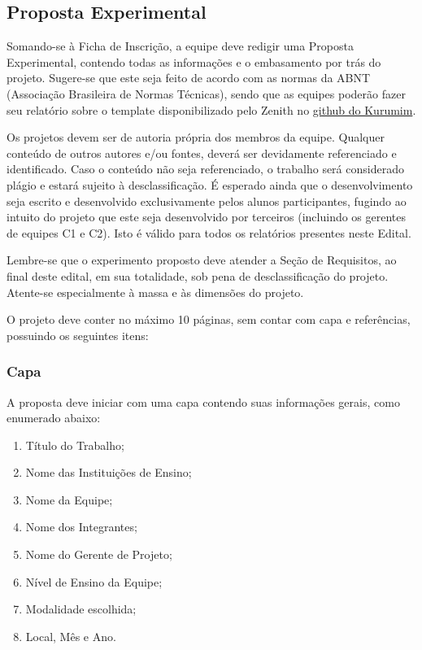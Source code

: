     \subsection{Proposta Experimental}
        Somando-se à Ficha de Inscrição, a equipe deve redigir uma Proposta Experimental, contendo todas as informações e o embasamento por trás do projeto. Sugere-se que este seja feito de acordo com as normas da ABNT (Associação Brasileira de Normas Técnicas), sendo que as equipes poderão fazer seu relatório sobre o template disponibilizado pelo Zenith no \href{https://github.com/zenitheesc/kurumim/tree/main/Relat%C3%B3rios}{\color{highcolor} github do Kurumim}.

        Os projetos devem ser de autoria própria dos membros da equipe. Qualquer conteúdo de outros autores e/ou fontes, deverá ser devidamente referenciado e identificado. Caso o conteúdo não seja referenciado, o trabalho será considerado plágio e estará sujeito à desclassificação. É esperado ainda que o desenvolvimento seja escrito e desenvolvido exclusivamente pelos alunos participantes, fugindo ao intuito do projeto que este seja desenvolvido por terceiros (incluindo os gerentes de equipes C1 e C2). Isto é válido para todos os relatórios presentes neste Edital.

        Lembre-se que o experimento proposto deve atender a Seção de Requisitos, ao final deste edital, em sua totalidade, sob pena de desclassificação do projeto. Atente-se especialmente à massa e às dimensões do projeto.

        O projeto deve conter no máximo 10 páginas, sem contar com capa e referências, possuindo os seguintes itens:
        
        \subsubsection{Capa}
            A proposta deve iniciar com uma capa contendo suas informações gerais, como enumerado abaixo:
            \begin{enumerate}
                \item Título do Trabalho; 
                \item Nome das Instituições de Ensino; 
                \item Nome da Equipe; 
                \item Nome dos Integrantes; 
                \item Nome do Gerente de Projeto;
                \item Nível de Ensino da Equipe;
                \item Modalidade escolhida;
                \item Local, Mês e Ano. 
            \end{enumerate}
                    
